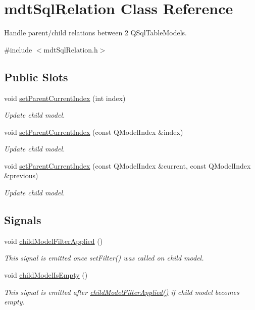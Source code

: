\hypertarget{classmdt_sql_relation}{
\section{mdtSqlRelation Class Reference}
\label{classmdt_sql_relation}
}


Handle parent/child relations between 2 QSqlTableModels.  




{\ttfamily \#include $<$mdtSqlRelation.h$>$}

\subsection*{Public Slots}
\begin{DoxyCompactItemize}
\item 
void \hyperlink{classmdt_sql_relation_a39fbecb027a5783277df1cc995485917}{setParentCurrentIndex} (int index)
\begin{DoxyCompactList}\small\item\em Update child model. \end{DoxyCompactList}\item 
void \hyperlink{classmdt_sql_relation_a4381f7f5bd39337fa5cbccf9b87ff0f6}{setParentCurrentIndex} (const QModelIndex \&index)
\begin{DoxyCompactList}\small\item\em Update child model. \end{DoxyCompactList}\item 
void \hyperlink{classmdt_sql_relation_a82a90b12bb78a4b0f9751244f134889d}{setParentCurrentIndex} (const QModelIndex \&current, const QModelIndex \&previous)
\begin{DoxyCompactList}\small\item\em Update child model. \end{DoxyCompactList}\end{DoxyCompactItemize}
\subsection*{Signals}
\begin{DoxyCompactItemize}
\item 
void \hyperlink{classmdt_sql_relation_a86656619d8156638ebfbde2b334d40e2}{childModelFilterApplied} ()
\begin{DoxyCompactList}\small\item\em This signal is emitted once setFilter() was called on child model. \end{DoxyCompactList}\item 
void \hyperlink{classmdt_sql_relation_ae30eb691c46263cb4021f55b03d0d111}{childModelIsEmpty} ()
\begin{DoxyCompactList}\small\item\em This signal is emitted after \hyperlink{classmdt_sql_relation_a86656619d8156638ebfbde2b334d40e2}{childModelFilterApplied()} if child model becomes empty. \end{DoxyCompactList}\end{DoxyCompactItemize}
